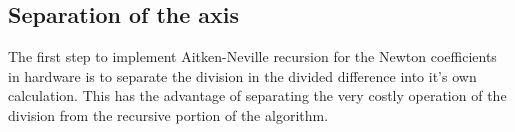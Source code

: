 \subsection{Separation of the axis}

The first step to implement Aitken-Neville recursion for the Newton coefficients
in hardware is to separate the division in the divided difference into it's own
calculation. This has the advantage of separating the very costly operation of
the division from the recursive portion of the algorithm.
